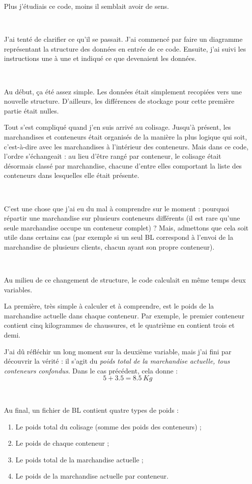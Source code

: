 Plus j'étudiais ce code, moins il semblait avoir de sens.

~

J'ai tenté de clarifier ce qu'il se passait. J'ai commencé par faire un diagramme représentant la structure des données en entrée de ce code. Ensuite, j'ai suivi les instructions une à une et indiqué ce que devenaient les données.

~

Au début, ça été assez simple. Les données était simplement recopiées vers une nouvelle structure. D'ailleurs, les différences de stockage pour cette première partie était nulles.

Tout s'est compliqué quand j'en suis arrivé au colisage. Jusqu'à présent, les marchandises et conteneurs était organisés de la manière la plus logique qui soit, c'est-à-dire avec les marchandises à l'intérieur des conteneurs. Mais dans ce code, l'ordre s'échangeait : au lieu d'être rangé par conteneur, le colisage était désormais classé par marchandise, chacune d'entre elles comportant la liste des conteneurs dans lesquelles elle était présente.

~

C'est une chose que j'ai eu du mal à comprendre sur le moment : pourquoi répartir une marchandise sur plusieurs conteneurs différents (il est rare qu'une seule marchandise occupe un conteneur complet) ? Mais, admettons que cela soit utile dans certains cas (par exemple si un seul BL correspond à l'envoi de la marchandise de plusieurs clients, chacun ayant son propre conteneur).

~

Au milieu de ce changement de structure, le code calculait en même temps deux variables.

La première, très simple à calculer et à comprendre, est le poids de la marchandise actuelle dans chaque conteneur. Par exemple, le premier conteneur contient cinq kilogrammes de chaussures, et le quatrième en contient trois et demi.

J'ai dû réfléchir un long moment sur la deuxième variable, mais j'ai fini par découvrir la vérité : il s'agit du \emph{poids total de la marchandise actuelle, tous conteneurs confondus}. Dans le cas précédent, cela donne : $$ 5 + 3.5 = 8.5~Kg $$

~

Au final, un fichier de BL contient quatre types de poids :
\begin{enumerate}
	\item Le poids total du colisage (somme des poids des conteneurs) ;
	\item Le poids de chaque conteneur ;
	\item Le poids total de la marchandise actuelle ;
	\item Le poids de la marchandise actuelle par conteneur.
\end{enumerate}

